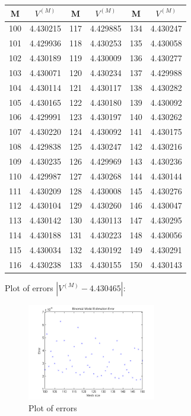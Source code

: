 \documentclass[a4paper]{article}
\begin{document}
\begin{enumerate}
\begin{enumerate}
\begin{table}[ht]
\centering
    \begin{tabular}{|c|c|c|c|c|c|}
    \hline
    M   & $V^{(M)}$   & M   & $V^{(M)}$   & M   & $V^{(M)}$   \\ \hline
    100 &    4.430215 & 117 &    4.429885 & 134 &    4.430247 \\ \hline
    101 &    4.429936 & 118 &    4.430253 & 135 &    4.430058 \\ \hline
    102 &    4.430189 & 119 &    4.430009 & 136 &    4.430277 \\ \hline
    103 &    4.430071 & 120 &    4.430234 & 137 &    4.429988 \\ \hline
    104 &    4.430114 & 121 &    4.430117 & 138 &    4.430282 \\ \hline
    105 &    4.430165 & 122 &    4.430180 & 139 &    4.430092 \\ \hline
    106 &    4.429991 & 123 &    4.430197 & 140 &    4.430262 \\ \hline
    107 &    4.430220 & 124 &    4.430092 & 141 &    4.430175 \\ \hline
    108 &    4.429838 & 125 &    4.430247 & 142 &    4.430216 \\ \hline
    109 &    4.430235 & 126 &    4.429969 & 143 &    4.430236 \\ \hline
    110 &    4.429987 & 127 &    4.430268 & 144 &    4.430144 \\ \hline
    111 &    4.430209 & 128 &    4.430008 & 145 &    4.430276 \\ \hline
    112 &    4.430104 & 129 &    4.430260 & 146 &    4.430047 \\ \hline
    113 &    4.430142 & 130 &    4.430113 & 147 &    4.430295 \\ \hline
    114 &    4.430188 & 131 &    4.430223 & 148 &    4.430056 \\ \hline
    115 &    4.430034 & 132 &    4.430192 & 149 &    4.430291 \\ \hline
    116 &    4.430238 & 133 &    4.430155 & 150 &    4.430143 \\ \hline
    \end{tabular}
\end{table}

Plot of errors $|V^{(M)}-4.430465|$:
\begin{figure}[ht]
\centering
\includegraphics[width=0.5\textwidth]{fig01.png}
\caption{\label{fig:fig01}Plot of errors}
\end{figure}


\end{enumerate}
\end{enumerate}
\end{document}
